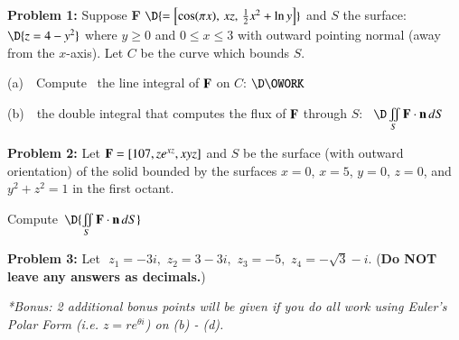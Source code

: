 \documentclass[11pt]{article}
\begin{document}
\vspace{1.0cm}

\thispagestyle{empty} 
\newpage
\thispagestyle{empty}

{\bf Problem 1:} Suppose {\bf F} $\D{= \left[\cos(\pi x),\, xz,\, \frac{1}{2}x^2+\ln y\right]}$ and $S$ the surface: $\D{z = 4-y^2}$ where $y \ge 0$ and $0\le x \le 3$ with outward pointing normal (away from the $x$-axis).  Let $C$ be the curve which bounds $S$.  

\vspace{0.2cm}

(a) \,\, Compute \, the line integral of ${\bf F}$ on $C$: $\D \OWORK$

\vspace{18.2cm}

(b) \,\,  the double integral that computes the flux of ${\bf F}$ through $S$: \, $\D \iint \limits_{S} {\bf F} \cdot {\bf n} \, dS$

\thispagestyle{empty}
\newpage
\thispagestyle{empty}

{\bf Problem 2:} Let $\text{\bf F} = [107,ze^{xz},xyz]$ and $S$ be the surface (with outward orientation) of the solid bounded by the surfaces $x = 0$, $x = 5$, $y = 0$, $z = 0$, and $y^2 + z^2 = 1$ in the first octant.

\vspace{0.2cm}

Compute \,$\D{\iint \limits_{S} \text{\bf F}\cdot \text{\bf n} \, dS}$

\thispagestyle{empty}
\newpage
\thispagestyle{empty}

%

{\bf Problem 3:} Let \,\,$z_1 = -3i,\,\, z_2 = 3-3i,\,\, z_3 = -5,\,\, z_4 = -\sqrt{3}-i$.  \quad ({\bf Do NOT leave any answers as decimals.}) 

\vspace{0.01cm}

{\it **Bonus: 2 additional bonus points will be given if you do all work using Euler's Polar Form (i.e. $z = re^{\theta i}$) on (b) - (d). }
\end{document}
